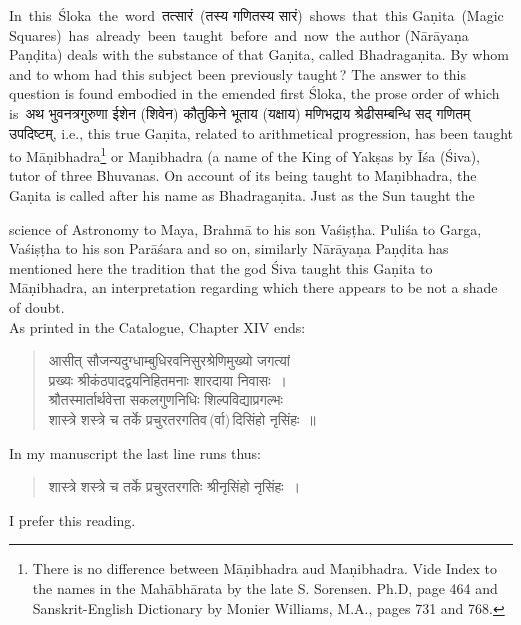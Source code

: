 \documentclass[11pt, openany]{book}
\begin{document}
 In \,this \,Śloka \,the \,word \,तत्सारं \,(तस्य गणितस्य सारं) \,shows \,that \,this Gaṇita \,(Magic Squares) \,has \,already \,been \,taught \,before \,and \,now \,the author (Nārāyaṇa Paṇḍita) deals
with 
the substance of that Gaṇita, called Bhadragaṇita. By whom 
and to whom had this subject been previously taught\,? The 
answer to this question is found embodied in the emended 
first Śloka, the prose order of which is\textemdash\ अथ भुवनत्रगुरुणा ईशेन 
(शिवेन) कौतुकिने भूताय (यक्षाय) मणिभद्राय श्रेढीसम्बन्धि सद् गणितम्
उपदिष्टम्, 
i.e., this true Gaṇita, related to arithmetical progression, has 
been taught to Māṇibhadra\renewcommand{\thefootnote}{4}\footnote{There is no difference between Māṇibhadra aud
Maṇibhadra. 
Vide Index to the names in the Mahābhārata by the late S. Sorensen. 
Ph.D, page 464 and Sanskrit-English Dictionary by Monier Williams, 
M.A., pages 731 and 768.} or Maṇibhadra (a name of the 
King of Yakṣas by Īśa (Śiva), tutor of three Bhuvanas. On 
account of its being taught to Maṇibhadra, the Gaṇita is called
after his name as Bhadragaṇita. Just as the Sun taught the 
\newpage%

\noindent science \;of \;Astronomy \;to \;Maya\;, \;Brahmā \;to \;his \;son Vaśiṣṭha. 
Puliśa to Garga, Vaśiṣṭha to his son Parāśara and so
on, 
similarly Nārāyaṇa Paṇḍita has mentioned here the
tradition 
that the god Śiva taught this Gaṇita to Māṇibhadra, an interpretation regarding which there appears to be not a shade of 
doubt. \\

\vspace{-2mm}
 As printed in the Catalogue, Chapter XIV ends: 
\begin{quote}
    \qt 
    आसीत् सौजन्यदुग्धाम्बुधिरवनिसुरश्रेणिमुख्यो जगत्यां\\
 प्रख्यः श्रीकंठपादद्वयनिहितमनाः शारदाया निवासः~। \\
 श्रौतस्मार्तार्थवेत्ता सकलगुणनिधिः शिल्पविद्याप्रगल्भः\\
 शास्त्रे शस्त्रे च तर्के प्रचुरतरगतिव\,(र्वा)\,दिसिंहो नृसिंहः~॥~
\end{quote}
 
 In my manuscript the last line runs thus: 
\begin{quote}
    \qt 
     शास्त्रे शस्त्रे च तर्के प्रचुरतरगतिः श्रीनृसिंहो नृसिंहः~। 
\end{quote}

 I prefer this reading.\\
\end{document}
